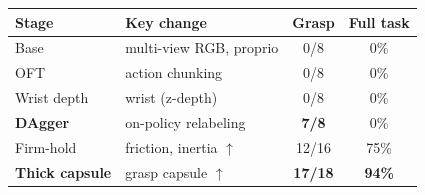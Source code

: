 \documentclass[a4paper,11pt]{article}
\newcommand{\best}[1]{\textbf{#1}}
\begin{document}
\null\vfill
\begin{center}
\label{tab:headline}

\renewcommand{\arraystretch}{1.25}
\begin{tabular}{l l c c}
\toprule
Stage & Key change & Grasp & Full task \\
\midrule
Base                 & multi-view RGB, proprio       & 0/8          & 0\% \\
OFT                  & action chunking               & 0/8          & 0\% \\
Wrist depth          & wrist (z-depth)               & 0/8          & 0\% \\
\best{DAgger}        & on-policy relabeling          & \best{7/8}   & 0\% \\
\midrule
Firm-hold            & friction, inertia $\uparrow$  & 12/16        & 75\% \\
\best{Thick capsule} & grasp capsule $\uparrow$      & \best{17/18} & \best{94\%} \\
\bottomrule
\end{tabular}
\end{center}
\vfill\null
\end{document}
